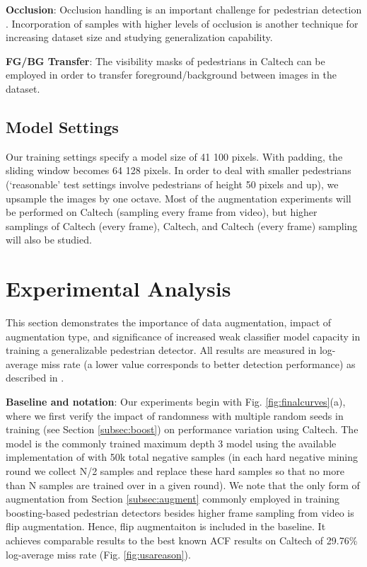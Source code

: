 \documentclass[a4paper,conference]{IEEEtran_icpr}
\begin{document}
\textbf{Occlusion}: Occlusion handling is an important challenge for pedestrian detection \cite{whyandwhen,ohnbar_pedspatterns15}. Incorporation of samples with higher levels of occlusion is another technique for increasing dataset size and studying generalization capability. 

\textbf{FG/BG Transfer}: The visibility masks of pedestrians in Caltech can be employed in order to transfer foreground/background between images in the dataset. 



\subsection{Model Settings}

Our training settings specify a model size of 41  100 pixels. With padding, the sliding window becomes 64  128 pixels. In order to deal with smaller pedestrians (`reasonable' test settings involve pedestrians of height 50 pixels and up), we upsample the images by one octave. Most of the augmentation experiments will be performed on Caltech (sampling every  frame from video), but higher samplings of Caltech (every  frame), Caltech, and Caltech (every frame) sampling will also be studied. 


\section{Experimental Analysis}
\label{sec:expeval}

This section demonstrates the importance of data augmentation, impact of augmentation type, and significance of increased weak classifier model capacity in training a generalizable pedestrian detector. All results are measured in log-average miss rate (a lower value corresponds to better detection performance) as described in \cite{dollar2012pedestrian}.

\textbf{Baseline and notation}: Our experiments begin with Fig. \ref{fig:finalcurves}(a), where we first verify the impact of randomness with multiple random seeds in training (see Section \ref{subsec:boost}) on performance variation using Caltech. The  model is the commonly trained maximum depth 3 model using the available implementation of \cite{dollar2012pedestrian} with 50k total negative samples (in each hard negative mining round we collect N/2 samples and replace these hard samples so that no more than N samples are trained over in a given round). We note that the only form of augmentation from Section \ref{subsec:augment} commonly employed in training boosting-based pedestrian detectors besides higher frame sampling from video is flip augmentation. Hence, flip augmentaiton is included in the  baseline. It achieves comparable results to the best known ACF results on Caltech of 29.76\% log-average miss rate (Fig. \ref{fig:usareason}). 
\end{document}
